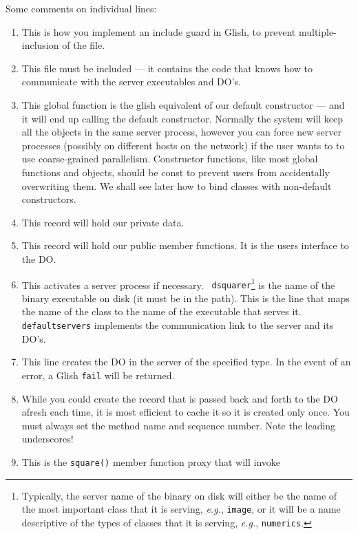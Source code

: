 Some comments on individual lines:
\begin{enumerate}
  \item This is how you implement an include guard in Glish, to
          prevent multiple-inclusion of the file.
  \item This file must be included --- it contains the code that knows
        how to communicate with the server executables and DO's.
  \item This global function is the glish equivalent of our default
        constructor --- and it will end up calling the default constructor.
        Normally the system will keep all the objects in the same server
        process, however you can force new server processes (possibly
        on different hosts on the network) if the user wants to
        to use coarse-grained parallelism. Constructor functions, like
        most global functions and objects, should be const to prevent
        users from accidentally overwriting them. We shall see later
        how to bind classes with non-default constructors.
  \item This record will hold our private data.
  \item This record will hold our public member functions. It is the
        users interface to the DO.
  \item This activates a server process if necessary. {\tt
        dsquarer}\footnote{Typically, the server name of the binary on
        disk will either be the name of the most important class that
        it is serving, {\em e.g.}, {\tt image}, or it will be a name
        descriptive of the types of classes that it is serving, {\em e.g.}, 
        {\tt numerics}.} is the name of the binary executable on disk (it 
        must be in
        the path). This is the line that maps the name of the class to
        the name of the executable that serves it.
        {\tt defaultservers} implements the communication link to the
        server and its DO's.
  \item This line creates the DO in the server of the specified type.
        In the event of an error, a Glish {\tt fail} will be returned.
  \item While you could create the record that is passed back and forth
        to the DO afresh each time, it is most efficient to cache it
        so it is created only once. You must always set the method name
        and sequence number. Note the leading underscores!        
  \item This is the {\tt square()} member function proxy that will invoke

\end{enumerate}
